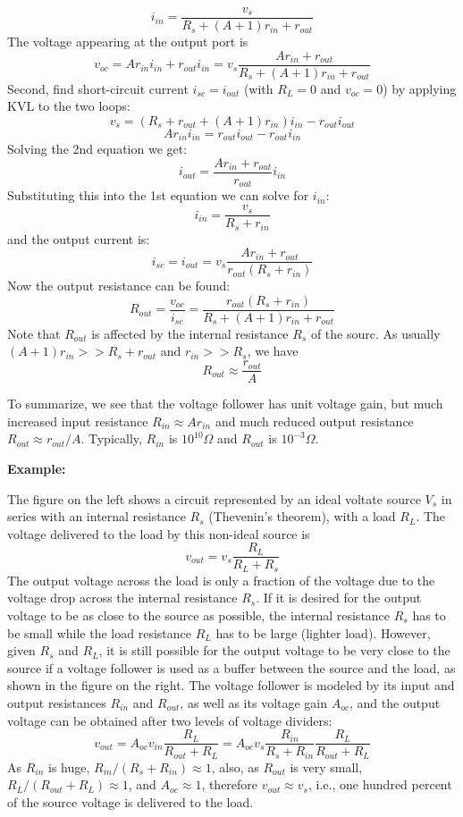 \begin{itemize}
\begin{itemize}
\[      i_{in}=\frac{v_s}{R_s+(A+1)r_{in}+r_{out}}      \]
      The voltage appearing at the output port is
      \[ v_{oc}=Ar_{in}i_{in}+r_{out}i_{in}
      =v_s\frac{Ar_{in}+r_{out}}{R_s+(A+1)r_{in}+r_{out}} \]
      Second, find short-circuit current $i_{sc}=i_{out}$ (with $R_L=0$ and 
      $v_{oc}=0$) by applying KVL to the two loops:
      \[ v_s=(R_s+r_{out}+(A+1)r_{in})i_{in}-r_{out} i_{out} \]
      \[ Ar_{in}i_{in}=r_{out} i_{out}-r_{out} i_{in} \]
      Solving the 2nd equation we get:
      \[ i_{out}=\frac{Ar_{in}+r_{out}}{r_{out}} i_{in} \]
      Substituting this into the 1st equation we can solve for $i_{in}$:
      \[ i_{in}=\frac{v_s}{R_s+r_{in}} \]
      and the output current is:
      \[ i_{sc}=i_{out}=v_s\frac{Ar_{in}+r_{out}}{r_{out}(R_s+r_{in})} \]
      Now the output resistance can be found:
      \[ R_{out}=\frac{v_{oc}}{i_{sc}}
      =\frac{r_{out}(R_s+r_{in})}{R_s+(A+1)r_{in}+r_{out}} \]
      Note that $R_{out}$ is affected by the internal resistance $R_s$ of the
      sourc. As usually $(A+1)r_{in}>>R_s+r_{out}$ and $r_{in}>>R_s$, we have
      \[ R_{out}\approx \frac{r_{out}}{A} \]
  \end{itemize}
  To summarize, we see that the voltage follower has unit voltage gain, but
  much increased input resistance $R_{in}\approx A r_{in}$ and much reduced
  output resistance $R_{out}\approx r_{out}/A$. Typically, $R_{in}$ is $10^{10}
  \Omega$ and $R_{out}$ is $10^{-3} \Omega$.

  {\bf Example:} 


  The figure on the left shows a circuit represented by an ideal voltate
  source $V_s$ in series with an internal resistance $R_s$ (Thevenin's
  theorem), with a load $R_L$. The voltage delivered to the load by this
  non-ideal source is
  \[ v_{out}=v_s \frac{R_L}{R_L+R_s} \]
  The output voltage across the load is only a fraction of the voltage due to 
  the voltage drop across the internal resistance $R_s$. If it is desired for
  the output voltage to be as close to the source as possible, the internal 
  resistance $R_s$ has to be small while the load resistance $R_L$ has to be
  large (lighter load). However, given $R_s$ and $R_L$, it is still possible
  for the output voltage to be very close to the source if a voltage follower
  is used as a buffer between the source and the load, as shown in the figure
  on the right. The voltage follower is modeled by its input and output
  resistances $R_{in}$ and $R_{out}$, as well as its voltage gain $A_{oc}$,
  and the output voltage can be obtained after two levels of voltage dividers:
  \[ v_{out}=A_{oc} v_{in} \frac{R_L}{R_{out}+R_L}=
  A_{oc} v_s \frac{R_{in}}{R_s+R_{in}}   \frac{R_L}{R_{out}+R_L} \]
  As $R_{in}$ is huge, $R_{in}/(R_s+R_{in})\approx 1$, also, as $R_{out}$
  is very small, $R_L/(R_{out}+R_L) \approx 1$, and $A_{oc} \approx 1$,
  therefore $v_{out} \approx v_s$, i.e., one hundred percent of the source
  voltage is delivered to the load.  


\end{itemize}

